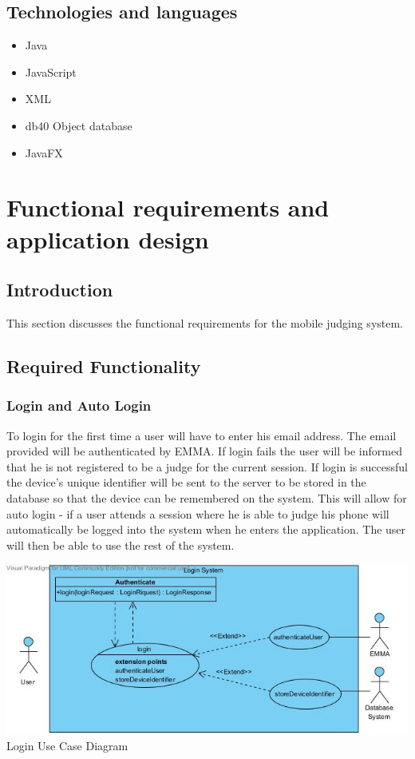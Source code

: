 \documentclass[10pt,a4paper]{article}
\begin{document}
\subsection{Technologies and languages}
\begin{itemize}
\item Java
\item JavaScript
\item XML
\item db40 Object database
\item JavaFX
\end{itemize}

\pagebreak
\section{Functional requirements and application design}
\subsection{Introduction}
This section discusses the functional requirements for the mobile judging system.
\subsection{Required Functionality}
\subsubsection{Login and Auto Login}
To login for the first time a user will have to enter his email address. The email provided will be authenticated by EMMA. If login fails the user will be informed that he is not registered to be a judge for the current session. If login is successful the device's unique identifier will be sent to the server to be stored in the database so that the device can be remembered on the system. This will allow for auto login - if a user attends a session where he is able to judge his phone will automatically be logged into the system when he enters the application. The user will then be able to use the rest of the system.

\begin{center}
\advance\leftskip-1.3cm
\includegraphics[width=160mm]{Pictures/Login.jpg} 
Login Use Case Diagram 
\end{center}
\end{document}
